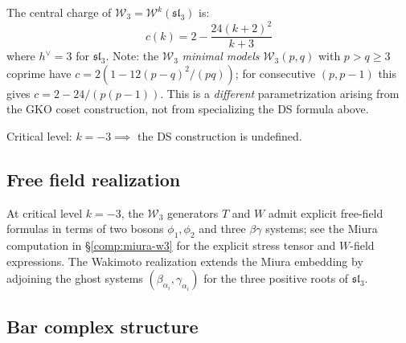 \begin{proposition}
\label{prop:w3-central-charge}
The central charge of $\mathcal{W}_3 = \mathcal{W}^k(\mathfrak{sl}_3)$ is:
\begin{equation}
c(k) = 2 - \frac{24(k+2)^2}{k+3}
\end{equation}
where $h^\vee = 3$ for $\mathfrak{sl}_3$. Note: the $\mathcal{W}_3$ \emph{minimal models} $\mathcal{W}_3(p,q)$ with $p > q \geq 3$ coprime have $c = 2(1 - 12(p-q)^2/(pq))$; for consecutive $(p, p-1)$ this gives $c = 2 - 24/(p(p-1))$.  This is a \emph{different} parametrization arising from the GKO coset construction, not from specializing the DS formula above.

Critical level: $k = -3 \implies$ the DS construction is undefined.
\end{proposition}

\subsection{Free field realization}

\begin{theorem}\label{thm:w3-wakimoto}
At critical level $k = -3$, the $\mathcal{W}_3$ generators $T$ and $W$ admit explicit free-field formulas in terms of two bosons $\phi_1, \phi_2$ and three $\beta\gamma$ systems; see the Miura computation in \S\ref{comp:miura-w3} for the explicit stress tensor and $W$-field expressions.  The Wakimoto realization extends the Miura embedding by adjoining the ghost systems $(\beta_{\alpha_i}, \gamma_{\alpha_i})$ for the three positive roots of $\mathfrak{sl}_3$.
\end{theorem}

\subsection{Bar complex structure}

